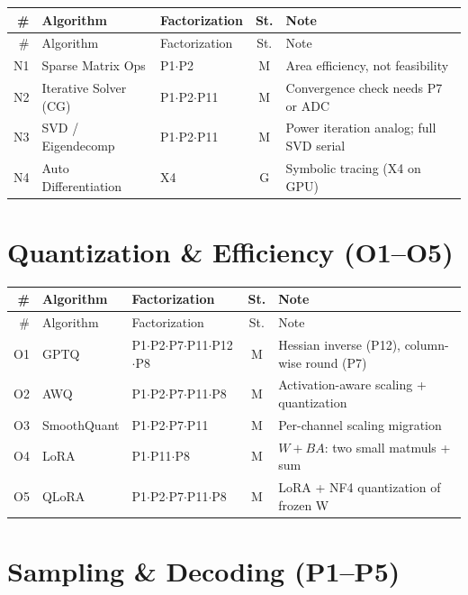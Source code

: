 \documentclass[10pt]{article}
\begin{document}
\begin{longtable}{rlp{3.0cm}cp{4.8cm}}
\toprule
\# & Algorithm & Factorization & St. & Note \\
\midrule
\endfirsthead
\toprule
\# & Algorithm & Factorization & St. & Note \\
\midrule
\endhead
\bottomrule
\endfoot
N1 & Sparse Matrix Ops & P1$\cdot$P2 & M & Area efficiency, not feasibility \\
N2 & Iterative Solver (CG) & P1$\cdot$P2$\cdot$P11 & M & Convergence check needs P7 or ADC \\
N3 & SVD / Eigendecomp & P1$\cdot$P2$\cdot$P11 & M & Power iteration analog; full SVD serial \\
N4 & Auto Differentiation & X4 & G & Symbolic tracing (X4 on GPU) \\
\end{longtable}

\section{Quantization \& Efficiency (O1--O5)}

\begin{longtable}{rlp{3.0cm}cp{4.8cm}}
\toprule
\# & Algorithm & Factorization & St. & Note \\
\midrule
\endfirsthead
\toprule
\# & Algorithm & Factorization & St. & Note \\
\midrule
\endhead
\bottomrule
\endfoot
O1 & GPTQ & P1$\cdot$P2$\cdot$P7$\cdot$P11$\cdot$P12$\cdot$P8 & M & Hessian inverse (P12), column-wise round (P7) \\
O2 & AWQ & P1$\cdot$P2$\cdot$P7$\cdot$P11$\cdot$P8 & M & Activation-aware scaling + quantization \\
O3 & SmoothQuant & P1$\cdot$P2$\cdot$P7$\cdot$P11 & M & Per-channel scaling migration \\
O4 & LoRA & P1$\cdot$P11$\cdot$P8 & M & $W + BA$: two small matmuls + sum \\
O5 & QLoRA & P1$\cdot$P2$\cdot$P7$\cdot$P11$\cdot$P8 & M & LoRA + NF4 quantization of frozen W \\
\end{longtable}

\section{Sampling \& Decoding (P1--P5)}
\end{document}
